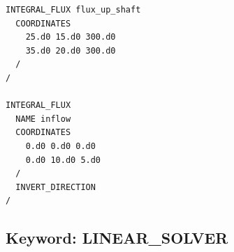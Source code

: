 \begin{mdframed}

\footnotesize

\begin{verbatim}
INTEGRAL_FLUX flux_up_shaft
  COORDINATES
    25.d0 15.d0 300.d0
    35.d0 20.d0 300.d0
  /
/

INTEGRAL_FLUX
  NAME inflow
  COORDINATES
    0.d0 0.d0 0.d0
    0.d0 10.d0 5.d0
  /
  INVERT_DIRECTION
/
\end{verbatim}
\normalsize
\end{mdframed}

\hyperlink{target_key}{\return}



\newpage

\protect\hypertarget{target_linsolv}{}

\subsection{Keyword: LINEAR\_SOLVER}

\hfill\hyperlink{target_key}{\return}


